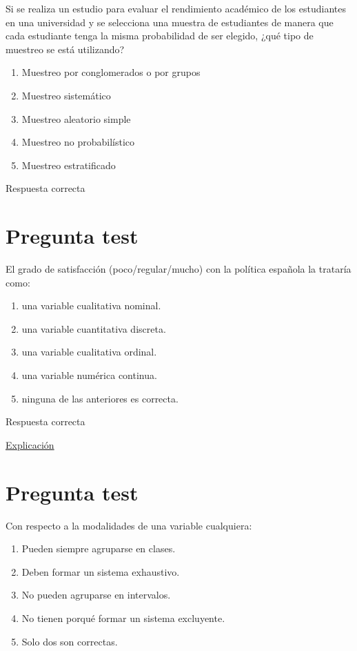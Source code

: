 \documentclass[
]{book}
\providecommand{\tightlist}{%
  \setlength{\itemsep}{0pt}\setlength{\parskip}{0pt}}
\begin{document}
Si se realiza un estudio para evaluar el rendimiento académico de los estudiantes en una universidad y se selecciona una muestra de estudiantes de manera que cada estudiante tenga la misma probabilidad de ser elegido, ¿qué tipo de muestreo se está utilizando?

\begin{enumerate}
\def\labelenumi{\alph{enumi})}
\tightlist
\item
  Muestreo por conglomerados o por grupos
\item
  Muestreo sistemático
\item
  Muestreo aleatorio simple
\item
  Muestreo no probabilístico
\item
  Muestreo estratificado
\end{enumerate}

Respuesta correcta

\hypertarget{pregunta-test-29}{%
\section{Pregunta test}\label{pregunta-test-29}}

El grado de satisfacción (poco/regular/mucho) con la política española la trataría como:

\begin{enumerate}
\def\labelenumi{\alph{enumi})}
\tightlist
\item
  una variable cualitativa nominal.
\item
  una variable cuantitativa discreta.
\item
  una variable cualitativa ordinal.
\item
  una variable numérica continua.
\item
  ninguna de las anteriores es correcta.
\end{enumerate}

Respuesta correcta

\href{https://1fjmanzano.github.io/bioestadistica/tipos-de-variables.html}{Explicación}

\hypertarget{pregunta-test-30}{%
\section{Pregunta test}\label{pregunta-test-30}}

Con respecto a la modalidades de una variable cualquiera:

\begin{enumerate}
\def\labelenumi{\alph{enumi})}
\tightlist
\item
  Pueden siempre agruparse en clases.
\item
  Deben formar un sistema exhaustivo.
\item
  No pueden agruparse en intervalos.
\item
  No tienen porqué formar un sistema excluyente.
\item
  Solo dos son correctas.
\end{enumerate}
\end{document}
